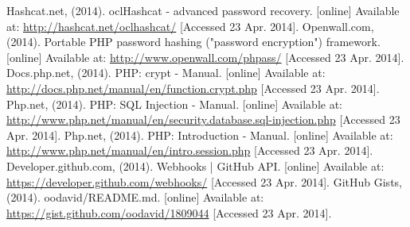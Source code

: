 \documentclass[11pt]{article}
\begin{document}
\begin{thebibliography}{40}
\begin{singlespace}
Hashcat.net, (2014). oclHashcat - advanced password recovery. [online] Available at: \url{http://hashcat.net/oclhashcat/} [Accessed 23 Apr. 2014].
Openwall.com, (2014). Portable PHP password hashing ("password encryption") framework. [online] Available at: \url{http://www.openwall.com/phpass/} [Accessed 23 Apr. 2014].
Docs.php.net, (2014). PHP: crypt - Manual. [online] Available at: \url{http://docs.php.net/manual/en/function.crypt.php} [Accessed 23 Apr. 2014].
Php.net, (2014). PHP: SQL Injection - Manual. [online] Available at: \url{http://www.php.net/manual/en/security.database.sql-injection.php} [Accessed 23 Apr. 2014].
Php.net, (2014). PHP: Introduction - Manual. [online] Available at: \url{http://www.php.net/manual/en/intro.session.php} [Accessed 23 Apr. 2014].
Developer.github.com, (2014). Webhooks | GitHub API. [online] Available at: \url{https://developer.github.com/webhooks/} [Accessed 23 Apr. 2014].
GitHub Gists, (2014). oodavid/README.md. [online] Available at: \url{https://gist.github.com/oodavid/1809044} [Accessed 23 Apr. 2014].
\end{singlespace} 
\end{thebibliography}
\end{document}
